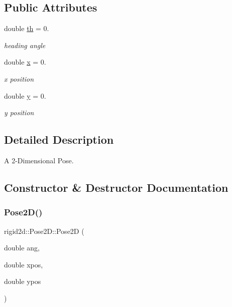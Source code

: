 \subsection*{Public Attributes}
\begin{DoxyCompactItemize}
\item 
\mbox{\label{structrigid2d_1_1Pose2D_aec39cadb59c95c2add01f01b07168a36}} 
double \hyperlink{structrigid2d_1_1Pose2D_aec39cadb59c95c2add01f01b07168a36}{th} = 0.
\begin{DoxyCompactList}\small\item\em heading angle \end{DoxyCompactList}\item 
\mbox{\label{structrigid2d_1_1Pose2D_a706d15249c213d0236481ff1bd13c42d}} 
double \hyperlink{structrigid2d_1_1Pose2D_a706d15249c213d0236481ff1bd13c42d}{x} = 0.
\begin{DoxyCompactList}\small\item\em x position \end{DoxyCompactList}\item 
\mbox{\label{structrigid2d_1_1Pose2D_a13f985853cc2b924ed87ed37e1857e7f}} 
double \hyperlink{structrigid2d_1_1Pose2D_a13f985853cc2b924ed87ed37e1857e7f}{y} = 0.
\begin{DoxyCompactList}\small\item\em y position \end{DoxyCompactList}\end{DoxyCompactItemize}


\subsection{Detailed Description}
A 2-\/\+Dimensional Pose. 

\subsection{Constructor \& Destructor Documentation}
\mbox{\label{structrigid2d_1_1Pose2D_aec3600c75f7341955ba7e8881cdd101a}} 
\subsubsection{\texorpdfstring{Pose2\+D()}{Pose2D()}}
{\footnotesize\ttfamily rigid2d\+::\+Pose2\+D\+::\+Pose2D (\begin{DoxyParamCaption}\item[{double}]{ang,  }\item[{double}]{xpos,  }\item[{double}]{ypos }\end{DoxyParamCaption})}



